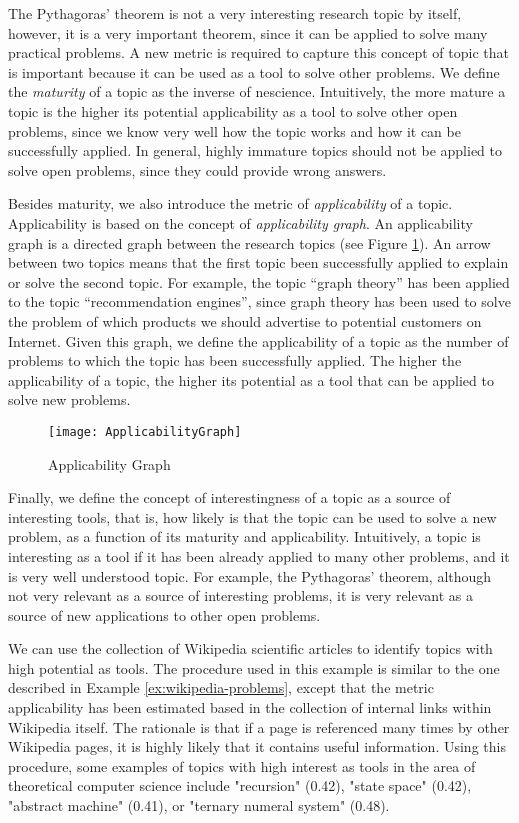 The Pythagoras' theorem is not a very interesting research topic by itself, however, it is a very important theorem, since it can be applied to solve many practical problems. A new metric is required to capture this concept of topic that is important because it can be used as a tool to solve other problems. We define the \emph{maturity} of a topic as the inverse of nescience. Intuitively, the more mature a topic is the higher its potential applicability as a tool to solve other open problems, since we know very well how the topic works and how it can be successfully applied. In general, highly immature topics should not be applied to solve open problems, since they could provide wrong answers.

Besides maturity, we also introduce the metric of \emph{applicability} of a topic. Applicability is based on the concept of \emph{applicability graph}. An applicability graph is a directed graph between the research topics (see Figure \ref{fig:ApplicabilityGraph}). An arrow between two topics means that the first topic been successfully applied to explain or solve the second topic. For example, the topic “graph theory” has been applied to the topic “recommendation engines”, since graph theory has been used to solve the problem of which products we should advertise to potential customers on Internet. Given this graph, we define the applicability of a topic as the number of problems to which the topic has been successfully applied. The higher the applicability of a topic, the higher its potential as a tool that can be applied to solve new problems.

\begin{figure}[h]
\centering\texttt{[image: ApplicabilityGraph]}
\caption{\label{fig:ApplicabilityGraph}Applicability Graph}
\end{figure}

Finally, we define the concept of interestingness of a topic as a source of interesting tools, that is, how likely is that the topic can be used to solve a new problem, as a function of its maturity and applicability. Intuitively, a topic is interesting as a tool if it has been already applied to many other problems, and it is very well understood topic. For example, the Pythagoras' theorem, although not very relevant as a source of interesting problems, it is very relevant as a source of new applications to other open problems.

\begin{example}
We can use the collection of Wikipedia scientific articles to identify topics with high potential as tools. The procedure used in this example is similar to the one described in Example \ref{ex:wikipedia-problems}, except that the metric applicability has been estimated based in the collection of internal links within Wikipedia itself. The rationale is that if a page is referenced many times by other Wikipedia pages, it is highly likely that it contains useful information. Using this procedure, some examples of topics with high interest as tools in the area of theoretical computer science include "recursion" (0.42), "state space" (0.42), "abstract machine" (0.41), or "ternary numeral system" (0.48).
\end{example}

